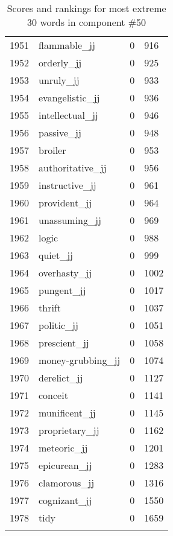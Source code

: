\begin{longtable}[!htbp]{| rlr@{.}l |}
    1951 & flammable\_jj & 0 & 916 \\
    1952 & orderly\_jj & 0 & 925 \\
    1953 & unruly\_jj & 0 & 933 \\
    1954 & evangelistic\_jj & 0 & 936 \\
    1955 & intellectual\_jj & 0 & 946 \\
    1956 & passive\_jj & 0 & 948 \\
    1957 & broiler & 0 & 953 \\
    1958 & authoritative\_jj & 0 & 956 \\
    1959 & instructive\_jj & 0 & 961 \\
    1960 & provident\_jj & 0 & 964 \\
    1961 & unassuming\_jj & 0 & 969 \\
    1962 & logic & 0 & 988 \\
    1963 & quiet\_jj & 0 & 999 \\
    1964 & overhasty\_jj & 0 & 1002 \\
    1965 & pungent\_jj & 0 & 1017 \\
    1966 & thrift & 0 & 1037 \\
    1967 & politic\_jj & 0 & 1051 \\
    1968 & prescient\_jj & 0 & 1058 \\
    1969 & money-grubbing\_jj & 0 & 1074 \\
    1970 & derelict\_jj & 0 & 1127 \\
    1971 & conceit & 0 & 1141 \\
    1972 & munificent\_jj & 0 & 1145 \\
    1973 & proprietary\_jj & 0 & 1162 \\
    1974 & meteoric\_jj & 0 & 1201 \\
    1975 & epicurean\_jj & 0 & 1283 \\
    1976 & clamorous\_jj & 0 & 1316 \\
    1977 & cognizant\_jj & 0 & 1550 \\
    1978 & tidy & 0 & 1659 \\
    \hline
    \caption{Scores and rankings for most extreme 30 words in component \#50} \\
\end{longtable}
